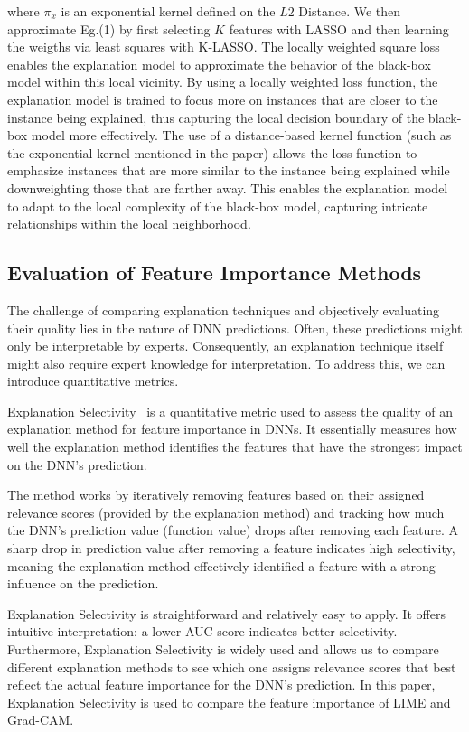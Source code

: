 \documentclass{article}
\begin{document}
where $\pi_x$ is an exponential kernel defined on the $L2$ Distance. We then approximate Eg.(1) by first selecting $K$ features with LASSO and then learning the weigths via least squares with K-LASSO.
The locally weighted square loss enables the explanation model to approximate the behavior of the black-box model within this local vicinity.
By using a locally weighted loss function, the explanation model is trained to focus more on instances that are closer to the instance being explained, thus capturing the local decision boundary of the black-box model more effectively.
The use of a distance-based kernel function (such as the exponential kernel mentioned in the paper) allows the loss function to emphasize instances that are more similar to the instance being explained while downweighting those that are farther away. This enables the explanation model to adapt to the local complexity of the black-box model, capturing intricate relationships within the local neighborhood. 


\subsection{Evaluation of Feature Importance Methods}
The challenge of comparing explanation techniques and objectively evaluating their quality lies in the nature of DNN predictions. Often, these predictions might only be interpretable by experts. Consequently, an explanation technique itself might also require expert knowledge for interpretation. To address this, we can introduce quantitative metrics.

Explanation Selectivity~\cite{MONTAVON20181} is a quantitative metric used to assess the quality of an explanation method for feature importance in DNNs. It essentially measures how well the explanation method identifies the features that have the strongest impact on the DNN's prediction.

The method works by iteratively removing features based on their assigned relevance scores (provided by the explanation method) and tracking how much the DNN's prediction value (function value) drops after removing each feature. A sharp drop in prediction value after removing a feature indicates high selectivity, meaning the explanation method effectively identified a feature with a strong influence on the prediction.

Explanation Selectivity is straightforward and relatively easy to apply. It offers intuitive interpretation: a lower AUC score indicates better selectivity. Furthermore, Explanation Selectivity is widely used and allows us to compare different explanation methods to see which one assigns relevance scores that best reflect the actual feature importance for the DNN's prediction. In this paper, Explanation Selectivity is used to compare the feature importance of LIME and Grad-CAM.
\end{document}
